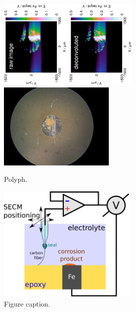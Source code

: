 \documentclass[3p]{elsarticle}
\begin{document}
\begin{figure}[H]
\centering
\includegraphics[trim = 20mm 30mm 0mm 20mm, clip, width=0.3\textwidth, angle=-90]{18012406.eps}
\includegraphics[trim = 20mm 30mm 0mm 20mm, clip, width=0.3\textwidth, angle=-90]{18012406_deconvoluted.eps}
\includegraphics[width=0.5\textwidth]{img.jpg}
\caption{Polyph.}
\label{fig:deconvolution}
\end{figure}



\begin{figure}[H]
\centering
\includegraphics[width=0.6\textwidth]{whisker.eps}
\caption{Figure caption.}
\label{fig:deconvolution}
\end{figure}
\end{document}
